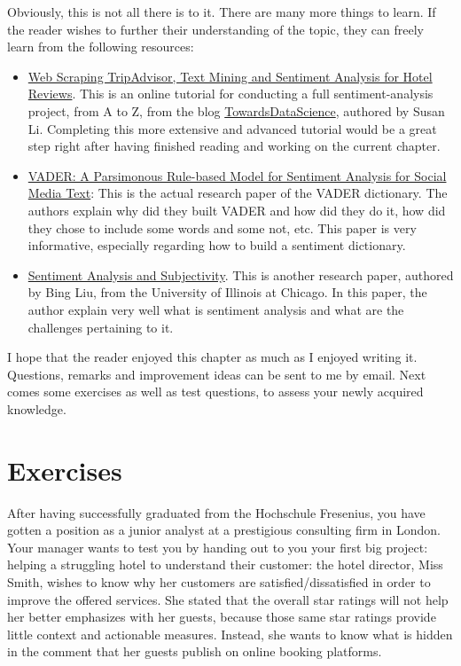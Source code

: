 	Obviously, this is not all there is to it. There are many more things to learn. If the reader wishes to further their understanding of the topic, they can freely learn from the following resources:
	\begin{itemize}
		\item \href{https://towardsdatascience.com/scraping-tripadvisor-text-mining-and-sentiment-analysis-for-hotel-reviews-cc4e20aef333}{Web Scraping TripAdvisor, Text Mining and Sentiment Analysis for Hotel Reviews}. This is an online tutorial for conducting a full sentiment-analysis project, from A to Z, from the blog \href{https://towardsdatascience.com/}{TowardsDataScience}, authored by Susan Li. Completing this more extensive and advanced tutorial would be a great step right after having finished reading and working on the current chapter.
		\item \href{http://comp.social.gatech.edu/papers/icwsm14.vader.hutto.pdf}{VADER: A Parsimonous Rule-based Model for Sentiment Analysis for Social Media Text}: This is the actual research paper of the VADER dictionary. The authors explain why did they built VADER and how did they do it, how did they chose to include some words and some not, etc. This paper is very informative, especially regarding how to build a sentiment dictionary.
		\item \href{https://www.cs.uic.edu/~liub/FBS/NLP-handbook-sentiment-analysis.pdf}{Sentiment Analysis and Subjectivity}. This is another research paper, authored by Bing Liu, from the University of Illinois at Chicago. In this paper, the author explain very well what is sentiment analysis and what are the challenges pertaining to it.
	\end{itemize}

	I hope that the reader enjoyed this chapter as much as I enjoyed writing it. Questions, remarks and improvement ideas can be sent to me by email. Next comes some exercises as well as test questions, to assess your newly acquired knowledge.

	\section{Exercises}
	After having successfully graduated from the Hochschule Fresenius, you have gotten a position as a junior analyst at a prestigious consulting firm in London. Your manager wants to test you by handing out to you your first big project: helping a struggling hotel to understand their customer: the hotel director, Miss Smith, wishes to know why her customers are satisfied/dissatisfied in order to improve the offered services. She stated that the overall star ratings will not help her better emphasizes with her guests, because those same star ratings provide little context and actionable measures. Instead, she wants to know what is hidden in the comment that her guests publish on online booking platforms. 
	
